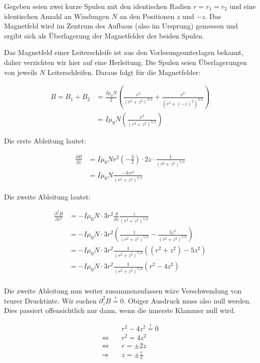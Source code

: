 \documentclass[a4paper,german,12pt,smallheadings]{scrartcl}
\begin{document}
Gegeben seien zwei kurze Spulen mit den identischen Radien $r = r_1 = r_2$ und
eine identischen Anzahl an Windungen $N$ an den Positionen $z$ und $-z$. Das
Magnetfeld wird im Zentrum des Aufbaus (also im Ursprung) gemessen und ergibt
sich als Überlagerung der Magnetfelder der beiden Spulen.

Das Magnetfeld einer Leiterschleife ist aus den Vorlesungsunterlagen bekannt,
daher verzichten wir hier auf eine Herleitung. Die Spulen seien Überlagerungen
von jeweils $N$ Leiterschleifen. Daraus folgt für die Magnetfelder:

\begin{align*}
  B = B_1 + B_2 &= \frac{I\mu_0 N}{2} \left(\frac{r^2}{(r^2 + z^2)^{3/2}} + \frac{r^2}{(r^2 + (-z)^2)^{3/2}}\right) \\
            &= I\mu_0 N \left(\frac{r^2}{(r^2 + z^2)^{3/2}}\right)
\end{align*}

Die erste Ableitung lautet:

\begin{align*}
  \frac{\partial B}{\partial z} &= I\mu_0 N r^2 \left(-\frac{3}{2}\right) \cdot 2z \cdot \frac{1}{(r^2 + z^2)^{5/2}} \\
                                &= I\mu_0 N \frac{-3zr^2}{(r^2 + z^2)^{5/2}}
\end{align*}

Die zweite Ableitung lautet:

\begin{align*}
  \frac{\partial^2 B}{\partial z^2} &= -I\mu_0 N \cdot 3 r^2 \frac{\partial}{\partial z} \frac{z}{(r^2 + z^2)^{5/2}} \\
                                    &= -I\mu_0 N \cdot 3 r^2 \left(\frac{1}{(r^2 + z^2)^{5/2}} - \frac{5z^2}{(r^2+z^2)^{7/2}}\right) \\
                                    &= -I\mu_0 N \cdot 3 r^2 \frac{1}{(r^2 + z^2)^{7/2}} \left( (r^2+z^2) - 5z^2 \right) \\
                                    &= -I\mu_0 N \cdot 3 r^2 \frac{1}{(r^2 + z^2)^{7/2}} \left( r^2 - 4z^2 \right) \\
\end{align*}

Die zweite Ableitung nun weiter zusammenzufassen wäre Verschwendung von
teurer Drucktinte. Wir suchen $\partial_z^2 B \overset{!}{=} 0$. Obiger Ausdruck
muss also null werden. Dies passiert offensichtlich nur dann, wenn die innerste
Klammer null wird.

\begin{align*}
  &r^2 - 4z^2 \overset{!}{=} 0 \\
  \Leftrightarrow\quad & r^2 = 4z^2 \\
  \Leftrightarrow\quad & r = \pm 2z \\
  \Rightarrow\quad &z = \pm\frac{r}{2}
\end{align*}
\end{document}
